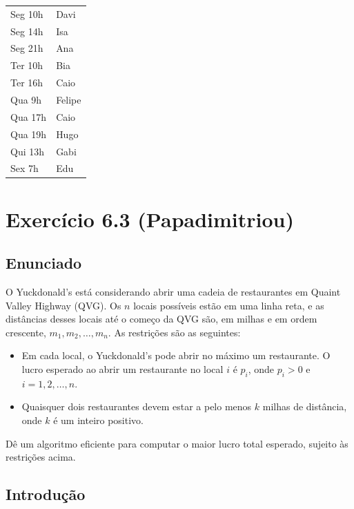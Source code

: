 \documentclass[11pt]{article}
\begin{document}
\begin{center}
\begin{tabular}{ll}
Seg 10h & Davi\\
Seg 14h & Isa\\
Seg 21h & Ana\\
Ter 10h & Bia\\
Ter 16h & Caio\\
Qua 9h & Felipe\\
Qua 17h & Caio\\
Qua 19h & Hugo\\
Qui 13h & Gabi\\
Sex 7h & Edu\\
\end{tabular}
\end{center}

\pagebreak

\section{Exercício 6.3 (Papadimitriou)}
\label{sec-3}

\subsection{Enunciado}
\label{sec-3-1}

O Yuckdonald's está considerando abrir uma cadeia de restaurantes em
Quaint Valley Highway (QVG). Os $n$ locais possíveis estão em uma
linha reta, e as distâncias desses locais até o começo da QVG são, em
milhas e em ordem crescente, $m_1, m_2, \ldots, m_n$. As restrições
são as seguintes:

\begin{itemize}
\item Em cada local, o Yuckdonald's pode abrir no máximo um
restaurante. O lucro esperado ao abrir um restaurante no local
$i$ é $p_i$, onde $p_i > 0$ e $i = 1, 2, \ldots, n$.
\item Quaisquer dois restaurantes devem estar a pelo menos $k$
  milhas de distância, onde $k$ é um inteiro positivo.
\end{itemize}

Dê um algoritmo eficiente para computar o maior lucro total
esperado, sujeito às restrições acima.

\subsection{Introdução}
\label{sec-3-2}
\label{sec-2}
\end{document}
